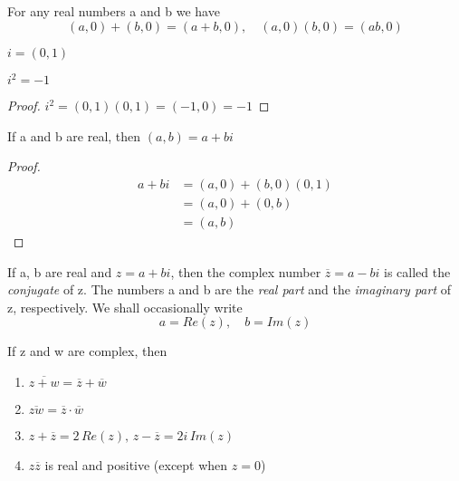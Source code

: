\documentclass[../poma-notes.tex]{subfiles}
\begin{document}
\begin{theorem}
	For any real numbers a and b we have
	\[(a,0) + (b,0) = (a+b,0), \quad (a,0)(b,0) = (ab,0)\]
\end{theorem}

\begin{definition}
	$i=(0,1)$
\end{definition}

\setcounter{poma}{27}
\begin{theorem}
	$i^2=-1$
\end{theorem}

\begin{proof}
	$i^2 = (0,1)(0,1) = (-1,0) = -1$
\end{proof}

\begin{theorem}
	If a and b are real, then $(a,b)=a+bi$
\end{theorem}

\begin{proof}
	\vspace{-26pt}
	\begin{align*}
		\mathcal{} a+bi & = (a,0) + (b,0)(0,1) \\
		                & = (a,0) + (0,b)      \\
		                & = (a,b)
	\end{align*}
\end{proof}

\begin{definition}
	If a, b are real and $z=a+bi$, then the complex number $\overline{z}=a-bi$ is called the \textit{conjugate} of z.
	The numbers a and b are the \textit{real part} and the \textit{imaginary part} of z, respectively.
	We shall occasionally write
	\[ a = Re(z),\quad b=Im(z)\]
\end{definition}

\begin{theorem}
	If z and w are complex, then
	\begin{enumerate}[label=(\alph*)]
		\item $\overline{z + w} = \overline{z} + \overline{w}$
		\item $\overline{zw} = \overline{z} \cdot \overline{w}$
		\item $z + \overline{z} = 2 \, Re(z), \, z - \overline{z} = 2i \, Im(z)$
		\item $z\overline{z}$ is real and positive (except when $z=0$)
	\end{enumerate}
\end{theorem}
\end{document}
